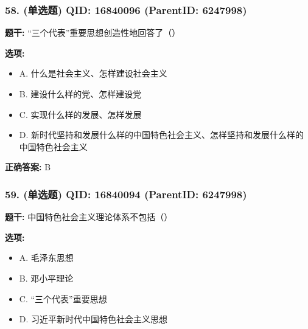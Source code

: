\documentclass[12pt,UTF8]{ctexart}
\begin{document}
\vspace{0.3em}\hrulefill\vspace{0.7em}

\subsubsection*{58. (单选题) \small QID: 16840096 (ParentID: 6247998)}

\textbf{题干:}
“三个代表”重要思想创造性地回答了（）



\textbf{选项:}
\begin{itemize}[leftmargin=*]

  \item A. 什么是社会主义、怎样建设社会主义

  \item B. 建设什么样的党、怎样建设党

  \item C. 实现什么样的发展、怎样发展

  \item D. 新时代坚持和发展什么样的中国特色社会主义、怎样坚持和发展什么样的中国特色社会主义

\end{itemize}

\textbf{正确答案:}
B

\vspace{0.3em}\hrulefill\vspace{0.7em}

\subsubsection*{59. (单选题) \small QID: 16840094 (ParentID: 6247998)}

\textbf{题干:}
中国特色社会主义理论体系不包括（）



\textbf{选项:}
\begin{itemize}[leftmargin=*]

  \item A. 毛泽东思想

  \item B. 邓小平理论

  \item C. “三个代表”重要思想

  \item D. 习近平新时代中国特色社会主义思想

\end{itemize}
\end{document}
